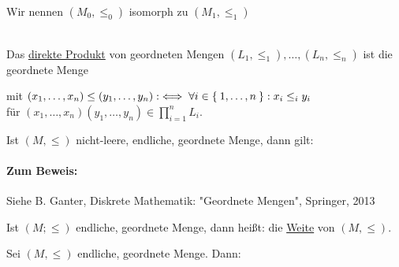 \documentclass{../../meta/tudscript}
\begin{document}
        Wir nennen $(M_0, \leq_0)$ isomorph zu $(M_1, \leq_1)$

        \\

        Das \underline{direkte Produkt} von geordneten Mengen $(L_1, \leq_1), \ldots, (L_n, \leq_n)$ ist die geordnete Menge

        mit $(x_1, \ldots, x_n) \leq (y_1, \ldots, y_n) :\iff \forall i \in \Set{1, \ldots, n}: x_i \leq_i y_i$\\
        für $(x_1, \ldots, x_n) (y_1, \ldots, y_n) \in \prod_{i = 1}^n L_i$.

        Ist $(M, \leq)$ nicht-leere, endliche, geordnete Menge, dann gilt:

        \paragraph{Zum Beweis:}
            Siehe B. Ganter, Diskrete Mathematik: "Geordnete Mengen", Springer, 2013

        Ist $(M; \leq)$ endliche, geordnete Menge, dann heißt:
        die \underline{Weite} von $(M, \leq)$.

        Sei $(M, \leq)$ endliche, geordnete Menge. Dann:
\end{document}
